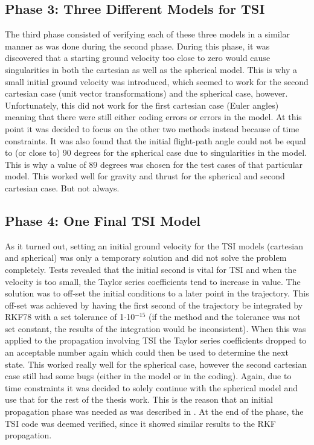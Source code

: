 \subsection{Phase 3: Three Different Models for \ac{TSI}}
\label{subsec:phase3com}
The third phase consisted of verifying each of these three models in a similar manner as was done during the second phase. During this phase, it was discovered that a starting ground velocity too close to zero would cause singularities in both the cartesian as well as the spherical model. This is why a small initial ground velocity was introduced, which seemed to work for the second cartesian case (unit vector transformations) and the spherical case, however. Unfortunately, this did not work for the first cartesian case (Euler angles) meaning that there were still either coding errors or errors in the model. At this point it was decided to focus on the other two methods instead because of time constraints. It was also found that the initial flight-path angle could not be equal to (or close to) 90 degrees for the spherical case due to singularities in the model. This is why a value of 89 degrees was chosen for the test cases of that particular model. This worked well for gravity and thrust for the spherical and second cartesian case. But not always.

\subsection{Phase 4: One Final \ac{TSI} Model}
\label{subsec:phase4com}
As it turned out, setting an initial ground velocity for the \ac{TSI} models (cartesian and spherical) was only a temporary solution and did not solve the problem completely. Tests revealed that the initial second is vital for \ac{TSI} and when the velocity is too small, the Taylor series coefficients tend to increase in value. The solution was to off-set the initial conditions to a later point in the trajectory. This off-set was achieved by having the first second of the trajectory be integrated by \ac{RKF78} with a set tolerance of 1$\cdot$10$^{-15}$ (if the method and the tolerance was not set constant, the results of the integration would be inconsistent). When this was applied to the propagation involving \ac{TSI} the Taylor series coefficients dropped to an acceptable number again which could then be used to determine the next state. This worked really well for the spherical case, however the second cartesian case still had some bugs (either in the model or in the coding). Again, due to time constraints it was decided to solely continue with the spherical model and use that for the rest of the thesis work. This is the reason that an initial propagation phase was needed as was described in . At the end of the phase, the \ac{TSI} code was deemed verified, since it showed similar results to the \ac{RKF} propagation. 

